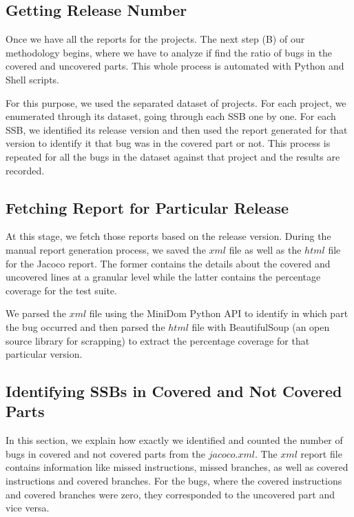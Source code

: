 \documentclass[sigconf,nonacm]{acmart}
\begin{document}
\subsection{Getting Release Number}

Once we have all the reports for the projects. The next step (B) of our methodology begins, where we have to analyze if find the ratio of bugs in the covered and uncovered parts. This whole process is automated with Python and Shell scripts.

For this purpose, we used the separated dataset of projects. For each project, we enumerated through its dataset, going through each SSB one by one. For each SSB, we identified its release version and then used the report generated for that version to identify it that bug was in the covered part or not. This process is repeated for all the bugs in the dataset against that project and the results are recorded.

\subsection{Fetching Report for Particular Release}

At this stage, we fetch those reports based on the release version. During the manual report generation process, we saved the $xml$ file as well as the $html$ file for the Jacoco report. The former contains the details about the covered and uncovered lines at a granular level while the latter contains the percentage coverage for the test suite.

We parsed the $xml$ file using the MiniDom Python API to identify in which part the bug occurred and then parsed the $html$ file with BeautifulSoup (an open source library for scrapping) to extract the percentage coverage for that particular version.

\subsection{Identifying SSBs in Covered and Not Covered Parts}

In this section, we explain how exactly we identified and counted the number of bugs in covered and not covered parts from the $jacoco.xml$. The $xml$ report file contains information like missed instructions, missed branches, as well as covered instructions and covered branches. For the bugs, where the covered instructions and covered branches were zero, they corresponded to the uncovered part and vice versa.
\end{document}
